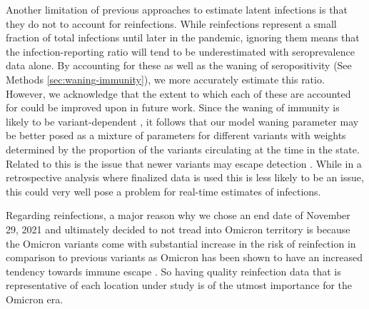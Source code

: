 \documentclass{article}
\begin{document}
Another limitation of previous approaches to estimate latent infections is
that they do not to account for reinfections. While
reinfections represent a small fraction of total infections until
later in the pandemic, ignoring them means that the
infection-reporting ratio will tend to be underestimated with seroprevalence
data alone. By accounting for these as well as the waning of seropositivity (See
Methods \autoref{sec:waning-immunity}), we more accurately estimate this ratio.
However, we acknowledge that the extent to which each of these are
accounted for could be improved upon in future work. 
Since the waning of immunity is likely to be variant-dependent
\citep{pooley2023durability}, it follows that our model waning parameter may be
better posed as a mixture of parameters for different variants with weights
determined by the proportion of the variants circulating at the time in the
state. Related to this is the issue that newer variants may escape detection
\citep{nih2022assessing, fda2023sars}. While in a retrospective analysis where
finalized data is used this is less likely to be an issue, this could very well
pose a problem for real-time estimates of infections.

Regarding reinfections, a major reason why we chose an end date of November 29,
2021 and ultimately decided to not tread into Omicron territory is because the
Omicron variants come with substantial increase in the risk of reinfection in
comparison to previous variants as Omicron has been shown to have an increased
tendency towards immune escape \citep{wei2024risk, pulliam2022increased,
eythorsson2022rate}. So having quality reinfection data that is representative
of each location under study is of the utmost importance for the Omicron era. 

\end{document}

